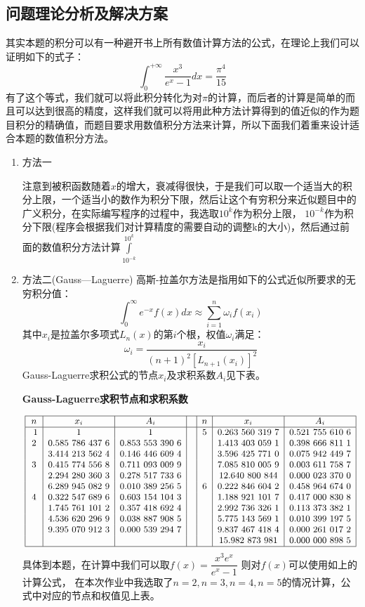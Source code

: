\documentclass{ctexart}
\begin{document}
\subsection{问题理论分析及解决方案}
其实本题的积分可以有一种避开书上所有数值计算方法的公式，在理论上我们可以证明如下的式子：
\[\int_{0}^{+\infty}\dfrac{x^3}{e^x-1}dx=\dfrac{\pi^4}{15}\]
有了这个等式，我们就可以将此积分转化为对$\pi$的计算，而后者的计算是简单的而且可以达到很高的精度，这样我们就可以将用此种方法计算得到的值近似的作为题目积分的精确值，而题目要求用数值积分方法来计算，所以下面我们着重来设计适合本题的数值积分方法。
\begin{enumerate}
\item 方法一

注意到被积函数随着$x$的增大，衰减得很快，于是我们可以取一个适当大的积分上限，一个适当小的数作为积分下限，然后让这个有穷积分来近似题目中的广义积分，在实际编写程序的过程中，我选取$10^k$作为积分上限，
$10^{-k}$作为积分下限(程序会根据我们对计算精度的需要自动的调整k的大小)，然后通过前面的数值积分方法计算$\int\limits_{10^{-k}}^{10^k}$
\item 方法二(Gauss—Laguerre)
高斯-拉盖尔方法是指用如下的公式近似所要求的无穷积分值：
\[\int_{0}^{\infty}e^{-x}f(x)dx\approx \sum_{i=1}^{n}\omega_if(x_i)\]
其中$x_i$是拉盖尔多项式$L_n(x)$的第$i$个根，权值$\omega_i$满足：
\[\omega_i=\dfrac{x_i}{(n+1)^2[L_{n+1}(x_i)]^2}\]
Gauss-Laguerre求积公式的节点$x_i$及求积系数$A_i$见下表。
\begin{center}
\bf{Gauss-Laguerre求积节点和求积系数}
\end{center}
$$
\small\begin{array}{|c|c|c|c|c|c|c|}
\hline
n&x_i&A_i&&n&x_i&A_i\\
\hline \
1&1&1&&5&0.263~560~319~7&0.521~755~610~6\\
2&0.585~786~437~6&0.853~553~390~6&&&1.413~403~059~1&0.398~666~811~1\\
&3.414~213~562~4&0.146~446~609~4&&&3.596~425~771~0&0.075~942~449~7\\
3&0.415~774~556~8&0.711~093~009~9&&&7.085~810~005~9&0.003~611~758~7\\
&2.294~280~360~3&0.278~517~733~6&&&12.640~800~844&0.000~023~370~0\\
&6.289~945~082~9&0.010~389~256~5&&6&0.222~846~604~2&0.458~964~674~0\\
4&0.322~547~689~6&0.603~154~104~3&&&1.188~921~101~7&0.417~000~830~8\\
&1.745~761~101~2&0.357~418~692~4&&&2.992~736~326~1&0.113~373~382~1\\
&4.536~620~296~9&0.038~887~908~5&&&5.775~143~569~1&0.010~399~197~5\\
&9.395~070~912~3&0.000~539~294~7&&&9.837~467~418~4&0.000~261~017~2\\
&&&&&15.982~873~981&0.000~000~898~5\\
\hline
\end{array}
$$
具体到本题，在计算中我们可以取$f(x)=\dfrac{x^3e^x}{e^x-1}$
则对$f(x)$可以使用如上的计算公式，
在本次作业中我选取了$n=2,n=3,n=4,n=5$的情况计算，公式中对应的节点和权值见上表。

\end{enumerate}
\end{document}
